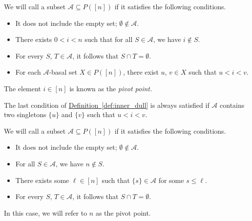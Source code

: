 \documentclass[main.tex]{subfiles}
\begin{document}
\begin{definition}
  \label{def:inner_dull}
  We will call a subset $\mathcal{A} \subseteq P([n])$  if it satisfies the following conditions.
  \begin{itemize}
    \item It does not include the empty set; $\emptyset \notin \mathcal{A}$.

    \item There exists $0 < i < n$ such that for all $S \in \mathcal{A}$, we have $i \notin S$.

    \item For every $S$, $T \in \mathcal{A}$, it follows that $S \cap T = \emptyset$.

    \item For each $\mathcal{A}$-basal set $X \in P([n])$, there exist $u$, $v \in X$ such that $u < i < v$.
  \end{itemize}

  The element $i \in [n]$ is known as the \emph{pivot point.}
\end{definition}

\begin{note}
  The last condition of \hyperref[def:inner_dull]{Definition~\ref*{def:inner_dull}} is always satisfied if $\mathcal{A}$ contains two singletons $\{u\}$ and $\{v\}$ such that $u < i < v$.
\end{note}

\begin{definition}
  We will call a subset $\mathcal{A} \subseteq P([n])$  if it satisfies the following conditions.
  \begin{itemize}
    \item It does not include the empty set; $\emptyset \notin \mathcal{A}$.

    \item For all $S \in \mathcal{A}$, we have $n \notin S$.

    \item There exists some $\ell \in [n]$ such that $\{s\} \in \mathcal{A}$ for some $s \leq \ell$.

    \item For every $S$, $T \in \mathcal{A}$, it follows that $S \cap T = \emptyset$.
  \end{itemize}

  In this case, we will refer to $n$ as the pivot point.
\end{definition}
\end{document}
